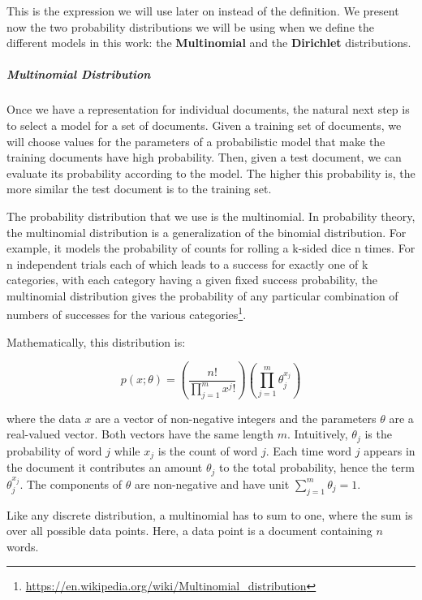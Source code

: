 \documentclass[12pt]{report}
\begin{document}
This is the expression we will use later on instead of the definition. We present 
now the two probability distributions we will be using when we define the different 
models in this work: the \textbf{Multinomial} and the \textbf{Dirichlet} distributions. 


\subparagraph{Multinomial Distribution}

Once we have a representation for individual documents, the natural next step
is to select a model for a set of documents. Given a training set of
documents, we will choose values for the parameters of a probabilistic model
that make the training documents have high probability. Then, given a test
document, we can evaluate its probability according to the model. The higher
this probability is, the more similar the test document is to the training set.


The probability distribution that we use is the multinomial. In probability 
theory, the multinomial distribution is a generalization of the binomial 
distribution. For example, it models the probability of counts for rolling 
a k-sided dice n times. For n independent trials each of which leads to a 
success for exactly one of k categories, with each category having a given 
fixed success probability, the multinomial distribution gives the 
probability of any particular combination of numbers of successes for the 
various categories\footnote{\url{https://en.wikipedia.org/wiki/Multinomial_distribution}}. 

Mathematically, this distribution is: 

\begin{equation}
p(x;\theta) = \left(\frac{n!}{\prod\limits_{j=1}^m x^j!}\right)\left
(\prod\limits_{j=1}^m \theta_j^{x_j}\right)
\end{equation}

where the data $x$ are a vector of non-negative integers and the parameters
$\theta$ are a real-valued vector. Both vectors have the same length $m$.
Intuitively, $\theta_j$ is the probability of word $j$ while $x_j$ is the count
of word $j$. Each time word $j$ appears in the document it contributes an amount
$\theta_j$ to the total probability, hence the term $\theta_j^{x_j}$. The
components of $\theta$ are non-negative and have unit $\sum\limits_{j=1}^m
\theta_j = 1$.

Like any discrete distribution, a multinomial has to sum to one, where the sum
is over all possible data points. Here, a data point is a document containing
$n$ words.\cite{Huang_maximumlikelihood}
\end{document}
